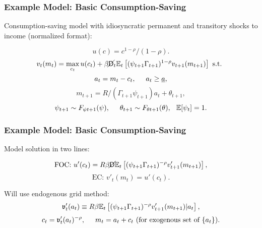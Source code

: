 \documentclass[public]{beamer}\beamerdefaultoverlayspecification{<+->}
\begin{document}
\begin{frame}\label{ModelMath}
  \frametitle{Example Model: Basic Consumption-Saving}

  Consumption-saving model with idiosyncratic permanent and transitory shocks to income (normalized format):

  \begin{equation*}
    u(c) = c^{1-\rho}/(1-\rho).
  \end{equation*}
  \begin{equation*}
    v_t(m_t) = \max_{c_t} u(c_t) + \beta \cancel{\mathsf{D}}_t \mathbb{E}_t \left[(\psi_{t+1} \Gamma_{t+1})^{1-\rho} v_{t+1}(m_{t+1}) \right] \text{ s.t. }
  \end{equation*}
  \begin{equation*}
    a_t = m_t - c_t, \hspace{0.5cm} a_t \geq \underline{a},
  \end{equation*}
  \begin{equation*}
    m_{t+1} = R/(\Gamma_{t+1} \psi_{t+1}) a_t + \theta_{t+1}, 
  \end{equation*}
  \begin{equation*}
    \psi_{t+1} \sim F_{\psi t+1}(\psi), \hspace{0.5cm} \theta_{t+1} \sim F_{\theta t+1}(\theta), \hspace{0.25cm} \mathbb{E}[\psi_t] = 1.
  \end{equation*}
\end{frame}



\begin{frame}
  \frametitle{Example Model: Basic Consumption-Saving}

  Model solution in two lines:

  \begin{equation*}
    \text{FOC: } u'(c_t) = R \beta \cancel{\mathsf{D}} \mathbb{E}_t \left[(\psi_{t+1} \Gamma_{t+1})^{-\rho} v'_{t+1}(m_{t+1}) \right],
  \end{equation*}
  \begin{equation*}
    \text{EC: } v'_t(m_t) = u'(c_t).
  \end{equation*}

  Will use endogenous grid method:
  \begin{equation*}
    \mathfrak{v}'_t(a_t) \equiv R \beta \mathbb{E}_t \left[(\psi_{t+1} \Gamma_{t+1})^{-\rho} v'_{t+1}(m_{t+1}) | a_t\right],
  \end{equation*}
  \begin{equation*}
    c_t = \mathfrak{v}'_t(a_t)^{-\rho}, \hspace{0.5cm} m_t = a_t + c_t \text{ (for exogenous set of } \{a_t\} \text{)}.
  \end{equation*}

  \hyperlink{ModelStatement}{}
\end{frame}
\end{document}
